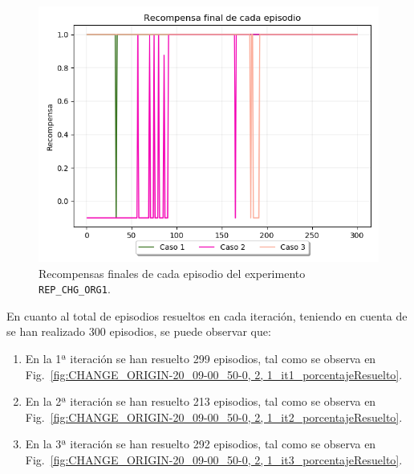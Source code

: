 \begin{figure}
    \centering
    \includegraphics[scale=0.4]{cap5_experimentacion/images/CHANGE_ORIGIN-20_09-00_50-0, 2, 1_recompensa.png}
    \caption{Recompensas finales de cada episodio del experimento \texttt{REP\_CHG\_ORG1}.}
    \label{fig:CHANGE_ORIGIN-20_09-00_50-0, 2, 1_recompensa}
\end{figure}
 
En cuanto al total de episodios resueltos en cada iteración, teniendo en cuenta de se han realizado 300 episodios, se puede observar que: 
\begin{enumerate}
    \item En la 1ª iteración se han resuelto 299 episodios, tal como se observa en Fig.~\ref{fig:CHANGE_ORIGIN-20_09-00_50-0, 2, 1_it1_porcentajeResuelto}.
    \item En la 2ª iteración se han resuelto 213 episodios, tal como se observa en Fig.~\ref{fig:CHANGE_ORIGIN-20_09-00_50-0, 2, 1_it2_porcentajeResuelto}.
    \item En la 3ª iteración se han resuelto 292 episodios, tal como se observa en Fig.~\ref{fig:CHANGE_ORIGIN-20_09-00_50-0, 2, 1_it3_porcentajeResuelto}.
\end{enumerate}

